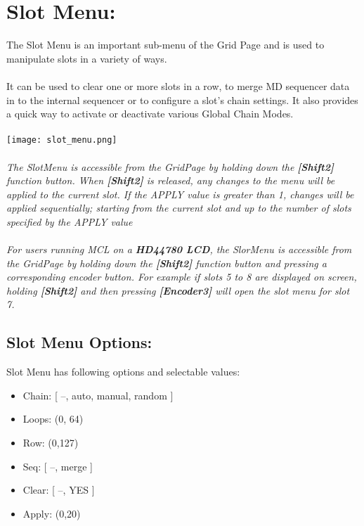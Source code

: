 \chapter{Slot Menu:}

The Slot Menu is an important sub-menu of the Grid Page and is used to manipulate slots in a variety of ways.\\\\
It can be used to clear one or more slots in a row, to merge  MD sequencer data in to the internal sequencer or to configure a slot's chain settings. It also provides a quick way to activate or deactivate various Global Chain Modes.
\\\\
\texttt{[image: slot\_menu.png]}
\\\\
\textit{The SlotMenu is accessible from the GridPage by holding down the  \textbf{[Shift2]} function 
button. When  \textbf{[Shift2]}  is released, any changes to the menu will be applied to the current slot. If the APPLY value is greater than 1, changes will be applied sequentially; starting from the current slot and up to the number of slots specified by the APPLY value}
\\\\
\textit{For users running MCL on a \textbf{HD44780 LCD}, the SlorMenu  is accessible from the GridPage by holding down the  \textbf{[Shift2]} function button and pressing a corresponding encoder button. For example if slots 5 to 8 are displayed on screen, holding  \textbf{[Shift2]} and then pressing \textbf{[Encoder3]} will open the slot menu for slot 7.}

\section{Slot Menu Options:}
Slot Menu has following options and selectable values:
\begin{itemize}

\item{Chain: [ --, auto, manual, random ]}


\item{Loops:  (0, 64)}
\item{Row:    (0,127)}
\item{Seq: [ --, merge ]}
\item{Clear: [ --, YES ]}
\item{Apply: (0,20)}

\end{itemize}

